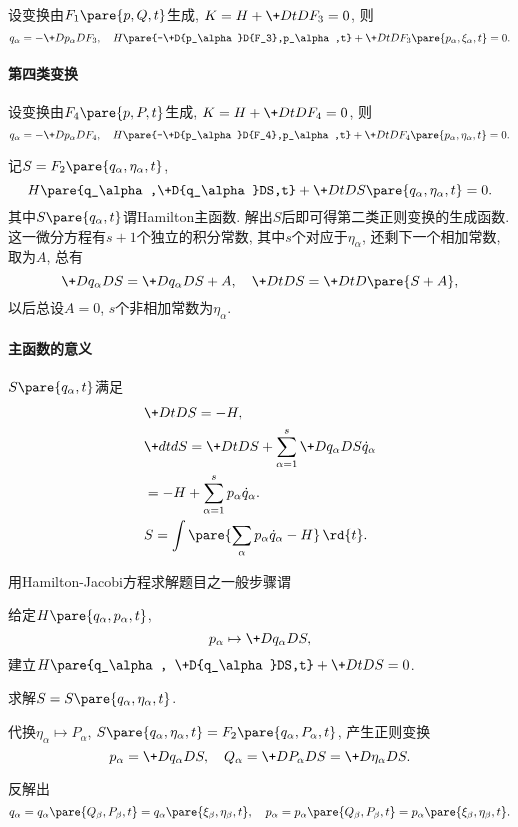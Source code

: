 \documentclass[../LectureNotes.tex]{subfiles}
\begin{document}
设变换由$F_1\pare{p,Q,t}$生成, $K = H + \displaystyle \+DtD{F_3} = 0$, 则
\[ q_\alpha = -\+D{p_\alpha}D{F_3},\quad H\pare{-\+D{p_\alpha}D{F_3},p_\alpha,t} + \+DtD{F_3\pare{p_\alpha,\xi_\alpha,t}} = 0. \]


\paragraph{第四类变换} %
\label{par:第四类变换}

设变换由$F_4\pare{p,P,t}$生成, $K = H + \displaystyle \+DtD{F_4} = 0$, 则
\[ q_\alpha = -\+D{p_\alpha}D{F_4},\quad H\pare{-\+D{p_\alpha}D{F_4},p_\alpha,t} + \+DtD{F_4\pare{p_\alpha,\eta_\alpha,t}} = 0. \]


记$S = F_2\pare{q_\alpha,\eta_\alpha,t}$,
\[ H\pare{q_\alpha,\+D{q_\alpha}DS,t} + \+DtD{S\pare{q_\alpha,\eta_\alpha,t}} = 0. \]
其中$S\pare{q_\alpha,t}$谓Hamilton主函数. 解出$S$后即可得第二类正则变换的生成函数. 这一微分方程有$s+1$个独立的积分常数, 其中$s$个对应于$\eta_\alpha$, 还剩下一个相加常数, 取为$A$, 总有
\[ \+D{q_\alpha}DS = \+D{q_\alpha}D{S+A},\quad \+DtDS = \+DtD{\pare{S+A}}, \]
以后总设$A = 0$, $s$个非相加常数为$\eta_\alpha$.

\paragraph{主函数的意义} %
\label{par:主函数的意义}

$S\pare{q_\alpha,t}$满足
\begin{align*}
    &\+DtDS = -H, \\
    & \+dtdS = \+DtDS + \sum_{\alpha=1}^s \+D{q_\alpha}DS\dot{q}_\alpha \\
    &= -H + \sum_{\alpha=1}^s p_\alpha\dot{q}_\alpha. \\
    & S= \int \pare{\sum_\alpha p_\alpha\dot{q}_\alpha - H}\,\rd{t}.
\end{align*}


用Hamilton-Jacobi方程求解题目之一般步骤谓
\begin{cenum}
    \item 给定$H\pare{q_\alpha,p_\alpha,t}$,
    \[ p_\alpha \mapsto \+D{q_\alpha}DS, \]
    建立$\displaystyle H\pare{q_\alpha, \+D{q_\alpha}DS,t} + \+DtDS = 0$.
    \item 求解$S = S\pare{q_\alpha,\eta_\alpha,t}$.
    \item 代换$\eta_\alpha \mapsto P_\alpha$, $S\pare{q_\alpha,\eta_\alpha,t} = F_2\pare{q_\alpha,P_\alpha,t}$, 产生正则变换
    \[ p_\alpha = \+D{q_\alpha}DS,\quad Q_\alpha = \+D{P_\alpha}DS = \+D{\eta_\alpha}DS. \]
    \item 反解出
    \[ q_\alpha = q_\alpha\pare{Q_\beta,P_\beta,t} = q_\alpha\pare{\xi_\beta,\eta_\beta,t}, \quad p_\alpha = p_\alpha\pare{Q_\beta,P_\beta,t} = p_\alpha\pare{\xi_\beta,\eta_\beta,t}. \]
\end{cenum}
\end{document}
